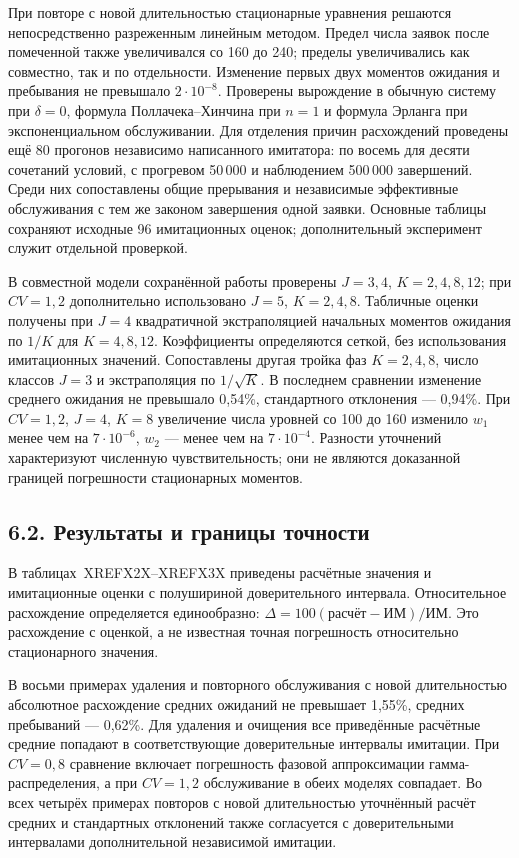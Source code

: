 При повторе с новой длительностью стационарные уравнения решаются непосредственно разреженным линейным методом. Предел числа заявок после помеченной также увеличивался со 160 до 240; пределы увеличивались как совместно, так и по отдельности. Изменение первых двух моментов ожидания и пребывания не превышало \(2\cdot10^{-8}.\) Проверены вырождение в обычную систему при \(\delta=0\), формула Поллачека--Хинчина при \(n=1\) и формула Эрланга при экспоненциальном обслуживании. Для отделения причин расхождений проведены ещё 80 прогонов независимо написанного имитатора: по восемь для десяти сочетаний условий, с прогревом 50\,000 и наблюдением 500\,000 завершений. Среди них сопоставлены общие прерывания и независимые эффективные обслуживания с тем же законом завершения одной заявки. Основные таблицы сохраняют исходные 96 имитационных оценок; дополнительный эксперимент служит отдельной проверкой.

В совместной модели сохранённой работы проверены \(J=3,4\), \(K=2,4,8,12\); при \(CV=1{,}2\) дополнительно использовано \(J=5\), \(K=2,4,8.\) Табличные оценки получены при \(J=4\) квадратичной экстраполяцией начальных моментов ожидания по \(1/K\) для \(K=4,8,12.\) Коэффициенты определяются сеткой, без использования имитационных значений. Сопоставлены другая тройка фаз \(K=2,4,8\), число классов \(J=3\) и экстраполяция по \(1/\sqrt K.\) В последнем сравнении изменение среднего ожидания не превышало 0{,}54\%, стандартного отклонения --- 0{,}94\%. При \(CV=1{,}2\), \(J=4\), \(K=8\) увеличение числа уровней со 100 до 160 изменило \(w_1\) менее чем на \(7\cdot10^{-6}\), \(w_2\) --- менее чем на \(7\cdot10^{-4}.\) Разности уточнений характеризуют численную чувствительность; они не являются доказанной границей погрешности стационарных моментов.

\subsection*{6.2. Результаты и границы точности}
В таблицах~XREFX2X--XREFX3X приведены расчётные значения и имитационные оценки с полушириной доверительного интервала. Относительное расхождение определяется единообразно: \(\Delta=100(\text{расчёт}-\text{ИМ})/\text{ИМ}.\) Это расхождение с оценкой, а не известная точная погрешность относительно стационарного значения.

В восьми примерах удаления и повторного обслуживания с новой длительностью абсолютное расхождение средних ожиданий не превышает 1{,}55\%, средних пребываний --- 0{,}62\%. Для удаления и очищения все приведённые расчётные средние попадают в соответствующие доверительные интервалы имитации. При \(CV=0{,}8\) сравнение включает погрешность фазовой аппроксимации гамма-распределения, а при \(CV=1{,}2\) обслуживание в обеих моделях совпадает. Во всех четырёх примерах повторов с новой длительностью уточнённый расчёт средних и стандартных отклонений также согласуется с доверительными интервалами дополнительной независимой имитации.

